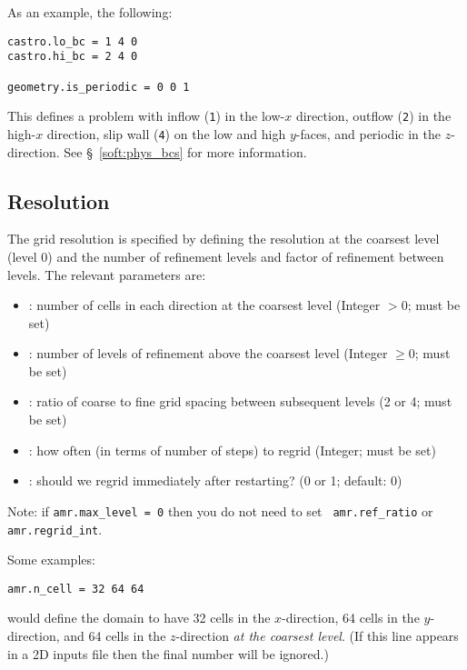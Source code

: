 As an example, the following:
\begin{lstlisting}
castro.lo_bc = 1 4 0 
castro.hi_bc = 2 4 0 

geometry.is_periodic = 0 0 1
\end{lstlisting}

This defines a problem with inflow ({\tt 1}) in the low-$x$ direction,
outflow ({\tt 2}) in the high-$x$ direction, slip wall ({\tt 4}) on
the low and high $y$-faces, and periodic in the $z$-direction.
See \S~\ref{soft:phys_bcs} for more information.

\subsection{Resolution}

The grid resolution is specified by defining the resolution at the
coarsest level (level 0) and the number of refinement levels and
factor of refinement between levels.  The relevant parameters are:
\begin{itemize}
\item {}: number of cells in each direction at the
  coarsest level (Integer $> 0$; must be set)

\item {}: number of levels of refinement above the
  coarsest level (Integer $\geq 0$; must be set)

\item {}: ratio of coarse to fine grid spacing
  between subsequent levels (2 or 4; must be set)

\item {}: how often (in terms of number of steps)
  to regrid (Integer; must be set)

\item {}: should we regrid immediately
  after restarting? (0 or 1; default: 0)
\end{itemize}

Note: if {\tt amr.max\_level = 0} then you do not need to set {\tt
  amr.ref\_ratio} or {\tt amr.regrid\_int}.

Some examples:
\begin{lstlisting}
amr.n_cell = 32 64 64
\end{lstlisting}
would define the domain to have 32 cells in the $x$-direction, 64 cells
in the $y$-direction, and 64 cells in the $z$-direction {\em{at the
coarsest level}}.  (If this line appears in a 2D inputs file then the
final number will be ignored.)\newline

